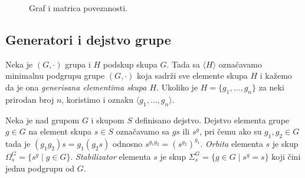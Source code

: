\documentclass[12pt,oneside]{memoir}
\theoremstyle{definition}
\begin{document}
   \begin{figure}[htp]
	   \centering
	   \hspace{20pt}
	   \caption{Graf i matrica povezanosti.}
	   \label{img:matrix}
   \end{figure}


   \subsection{Generatori i dejstvo grupe}

   Neka je $(G, \cdot)$ grupa i $H$ podskup skupa $G$. Tada sa $\langle H
   \rangle$ označavamo minimalnu podgrupu grupe $(G, \cdot)$ koja sadrži sve
   elemente skupa $H$ i kažemo da je ona \emph{generisana elementima skupa
   $H$}. Ukoliko je $H = \{g_1, \dots, g_n\}$ za neki prirodan broj $n$,
   koristimo i oznaku $\langle g_1, \dots, g_n \rangle$.

   Neka je nad grupom $G$ i skupom $S$ definisano dejstvo. Dejstvo elementa
   grupe $g \in G$ na element skupa $s \in S$ označavamo sa $gs$ ili $s^g$, pri
   čemu ako su $g_1, g_2 \in G$ tada je $(g_1g_2)s = g_1(g_2s)$ odnosno
   $s^{g_1g_2} = (s^{g_2})^{g_1}$.  \emph{Orbita} elementa $s$ je skup
   $\Omega_s^G = \{s^g \mid g \in G\}$.  \emph{Stabilizator} elementa $s$ je
   skup $\Sigma_s^G = \{g \in G \mid s^g=s\}$ koji čini jednu podgrupu od $G$.
\end{document}
